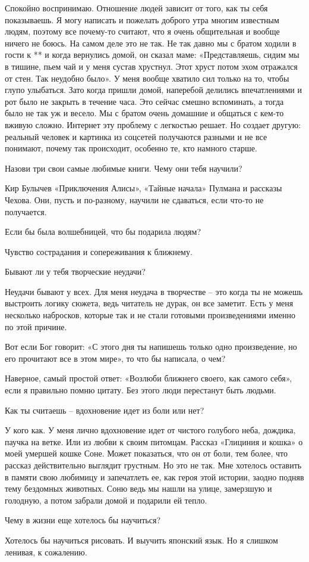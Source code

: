 Спокойно воспринимаю. Отношение людей зависит от того, как ты себя показываешь.
Я могу написать и пожелать доброго утра многим известным людям, поэтому все
почему-то считают, что я очень общительная и вообще ничего не боюсь. На самом
деле это не так. Не так давно мы с братом ходили в гости к ** и когда вернулись
домой, он сказал маме: «Представляешь, сидим мы в тишине, пьем чай и у меня
сустав хрустнул. Этот хруст потом эхом отражался от стен. Так неудобно было». У
меня вообще хватило сил только на то, чтобы глупо улыбаться. Зато когда пришли
домой, наперебой делились впечатлениями и рот было не закрыть в течение часа.
Это сейчас смешно вспоминать, а тогда было не так уж и весело. Мы с братом
очень домашние и общаться с кем-то вживую сложно. Интернет эту проблему с
легкостью решает. Но создает другую: реальный человек и картинка из соцсетей
получаются разными и не все понимают, почему так происходит, особенно те, кто
намного старше.

Назови три свои самые любимые книги. Чему они тебя научили?

Кир Булычев «Приключения Алисы», «Тайные начала» Пулмана и рассказы Чехова.
Они, пусть и по-разному, научили не сдаваться, если что-то не получается.

Если бы была волшебницей, что бы подарила людям?

Чувство сострадания и сопереживания к ближнему.

Бывают ли у тебя творческие неудачи?

Неудачи бывают у всех. Для меня неудача в творчестве – это когда ты не можешь
выстроить логику сюжета, ведь читатель не дурак, он все заметит. Есть у меня
несколько набросков, которые так и не стали готовыми произведениями именно по
этой причине.

Вот если Бог говорит: «С этого дня ты напишешь только одно произведение, но его
прочитают все в этом мире», то что бы написала, о чем?

Наверное, самый простой ответ: «Возлюби ближнего своего, как самого себя», если
я правильно помню цитату. Без этого люди перестанут быть людьми.

Как ты считаешь – вдохновение идет из боли или нет?

У кого как. У меня лично вдохновение идет от чистого голубого неба, дождика,
паучка на ветке. Или из любви к своим питомцам. Рассказ «Глициния и кошка» о
моей умершей кошке Соне. Может показаться, что он от боли, тем более, что
рассказ действительно выглядит грустным. Но это не так. Мне хотелось оставить в
памяти свою любимицу и запечатлеть ее, как героя этой истории, заодно подняв
тему бездомных животных. Соню ведь мы нашли на улице, замерзшую и голодную, а
потом забрали домой и подарили ей тепло.

Чему в жизни еще хотелось бы научиться?

Хотелось бы научиться рисовать. И выучить японский язык. Но я слишком ленивая,
к сожалению.

